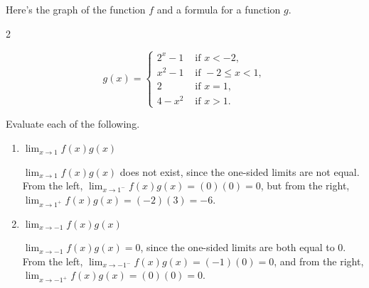 \documentclass{article}
\begin{document}
\begin{enumerate}
  Here's the graph of the function $f$ and a formula for a function $g$.

  \begin{multicols}{2}

    \begin{equation*}
      g(x)=\begin{cases}
        2^x - 1 & \text{ if } x < -2,\\
        x^2-1 & \text{ if } -2\leq x< 1,\\
        2 & \text{ if } x=1,\\
        4 -x^2 & \text{ if } x > 1.
      \end{cases}
    \end{equation*}
  \end{multicols}

  Evaluate each of the following. 

  \begin{enumerate}

  \item
    \begin{problem}[\vfill]
      $ \displaystyle \lim_{x\to 1}{f(x)g(x)}$
    \end{problem}

    \begin{solution}
      $ \displaystyle \lim_{x\to 1}{f(x)g(x)}$ does not exist, since the one-sided limits
      are not equal. From the left, $\displaystyle \lim_{x\to 1^-}{f(x)g(x)}=(0)(0)=0$,
      but from the right, $ \displaystyle \lim_{x\to 1^+}{f(x)g(x)}=(-2)(3)=-6$.
    \end{solution}

  \item
    \begin{problem}[\vfill]
      $ \displaystyle \lim_{x\to -1}{f(x)g(x)}$
    \end{problem}

    \begin{solution}
      $ \displaystyle \lim_{x\to -1}{f(x)g(x)}=0$, since the one-sided limits are 
      both equal to $0$. 
      From the left, $ \displaystyle \lim_{x\to -1^-}{f(x)g(x)}=(-1)(0)=0$,
      and from the right, $ \displaystyle \lim_{x\to -1^+}{f(x)g(x)}=(0)(0)=0$.
    \end{solution}


\end{enumerate}
\end{enumerate}
\end{document}
